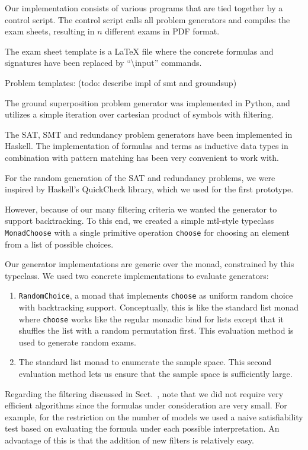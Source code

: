 Our implementation consists of various programs that are tied together by a control script.
The control script calls all problem generators
and compiles the exam sheets, resulting in $n$ different exams in PDF format.

The exam sheet template is a \LaTeX{} file
where the concrete formulas and signatures
have been replaced by ``\textbackslash{}input'' commands.



Problem templates: (todo: describe impl of smt and groundsup)


The ground superposition problem generator was implemented in Python,
and utilizes a simple iteration over cartesian product of symbols
with filtering.

The SAT, SMT and redundancy problem generators have been implemented in Haskell.
The implementation of formulas and terms as inductive data types
in combination with pattern matching has been very convenient to work with.

For the random generation of the SAT and redundancy problems,
we were inspired by Haskell's QuickCheck library,
which we used for the first prototype.

However, because of our many filtering criteria we wanted the generator to support backtracking.
To this end,
we created a simple mtl-style typeclass \texttt{MonadChoose}
with a single primitive operation \texttt{choose} for choosing an element from a list of possible choices.

Our generator implementations are generic over the monad, constrained by this typeclass.
We used two concrete implementations to evaluate generators:
\begin{enumerate}
    \item
        \texttt{RandomChoice}, a monad that implements \texttt{choose}
        as uniform random choice with backtracking support.
        Conceptually, this is like the standard list monad
        where \texttt{choose} works like the regular monadic bind for lists
        except that it shuffles the list with a random permutation first.
        This evaluation method is used to generate random exams.
    \item
        The standard list monad to enumerate the sample space.
        This second evaluation method lets us ensure that the sample space is sufficiently large.
\end{enumerate}

Regarding the filtering discussed in Sect.~\label{sec:satfo},
note that we did not require very efficient algorithms since
the formulas under consideration are very small.
For example, for the restriction on the number of models we used a naive satisfiability test
based on evaluating the formula under each possible interpretation.
An advantage of this is that the addition of new filters is relatively easy.

